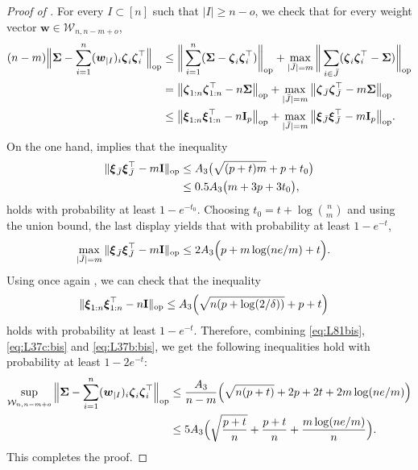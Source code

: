 \documentclass[aos,preprint,reqno]{imsart}
\newcommand\bxi{\boldsymbol\xi}
\newcommand\bzeta{\boldsymbol\zeta}
\newcommand\bSigma{\boldsymbol\Sigma}
\newcommand\bw{\boldsymbol w}
\newcommand\bfI{\mathbf I}
\theoremstyle{plain}
\theoremstyle{remark}
\begin{document}
	\begin{proof}[Proof of ]
	For every $I\subset [n]$ such that $|I| \ge n-o$, we check that
	for every weight vector $\bw\in \mathcal W_{n,n-m+o}$,
	\begin{align}
		(n-m) \Big\|\bSigma - \sum_{i=1}^n (\bw_{|I})_i \bzeta_i 
		    \bzeta_i^\top \Big\|_{\textup{op}}
		&\le  \bigg\|\sum_{i=1}^n(\bSigma-\bzeta_i\bzeta_i^\top)
		    \bigg\|_{\textup{op}} + \max_{|\bar J| = m} \bigg\|
		    \sum_{i\in \bar J}(\bzeta_i\bzeta_i^\top - \bSigma) \bigg\|_{\textup{op}}\\
		&=\big\|\bzeta_{1:n}\bzeta_{1:n}^\top-n\bSigma\big\|_{\textup{op}}
			+\max_{|\bar J| = m} \big\|\bzeta_{\bar J}\bzeta_{\bar J
			}^\top - m\bSigma\big\|_{\textup{op}}\\
		&\le\big\|\bxi_{1:n}\bxi_{1:n}^\top-n\bfI_p\big\|_{
		    \textup{op}} +\max_{|\bar J| = m} \big\|\bxi_{
		    \bar J}\bxi_{\bar J}^\top - m \bfI_p \big\|_{\textup{op}}.\label{eq:L81bis}
	\end{align}
	On the one hand,  implies that the inequality
	\begin{align}
	    \|\bxi_{\bar J}\bxi_{\bar J}^\top-m\bfI\|_{\textup{op}}
	    &\le A_3\big(\sqrt{(p+t)m} + p + t_0\big)\\
	    &\le 0.5A_3\big(m + 3p + 3t_0\big),%
	\end{align}
	holds with probability at least $1 - e^{-t_0}$. Choosing $t_0 =
	t + \log {n\choose{m}}$ and using the union bound, 
	the last display yields	that with probability at least $1-e^{-t}$,
	\begin{align}
		\max_{|\bar J| = m} \|\bxi_{\bar J}\bxi_{\bar J}^\top -m\bfI 
		    \|_{\textup{op}}
		&\le  2A_3\Big(p + m\log(ne/m) + t\Big).
		\label{eq:L37c:bis}
	\end{align}
    Using once again , we  can check that the 
    inequality
    \begin{align}
		\|\bxi_{1:n}\bxi_{1:n}^\top -n\bfI 
		    \|_{\textup{op}}
		&\le  A_3\Big(\sqrt{n(p+\log(2/\delta))} + p + t\Big)
		\label{eq:L37b:bis}
	\end{align}
    holds with probability at least $1-e^{-t}$. Therefore, combining
    \eqref{eq:L81bis}, \eqref{eq:L37c:bis} and \eqref{eq:L37b:bis}, we 
    get the following inequalities hold with probability at least
    $1-2e^{-t}$:
	\begin{align}
		\sup_{\mathcal W_{n,n-m+o}}\limits \Big\|\bSigma - 
			\sum_{i=1}^n (\bw_{|I})_i\bzeta_i\bzeta_i^\top\Big\|_{\textup{op}}
			&\le  \frac{A_3}{n-m}\Big(\sqrt{n(p+t)} + 2p + 
			2t + 2m\log(ne/m)\Big)\\
			&\le  5A_3\Big(\sqrt{\frac{p+t}{n}} + 
			\frac{p + t}{n} + \frac{m\log(ne/m)}{n}\Big).
			\label{eq:L85bis}
	\end{align}
	This completes the proof.
	\end{proof}
    
\end{document}
